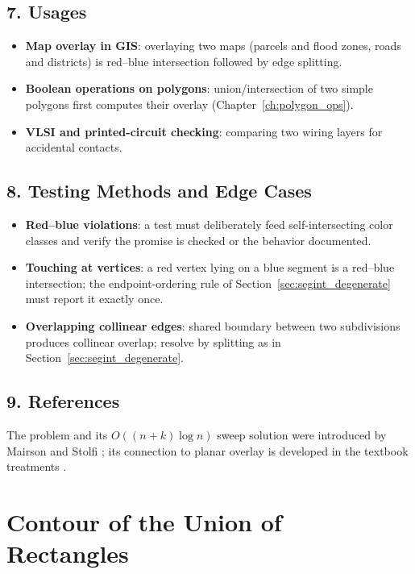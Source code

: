 \subsection{7. Usages}

\begin{itemize}
\item \textbf{Map overlay in GIS}: overlaying two maps (parcels and
  flood zones, roads and districts) is red--blue intersection followed by
  edge splitting.
\item \textbf{Boolean operations on polygons}: union/intersection of two
  simple polygons first computes their overlay (Chapter~\ref{ch:polygon_ops}).
\item \textbf{VLSI and printed-circuit checking}: comparing two wiring
  layers for accidental contacts.
\end{itemize}

\subsection{8. Testing Methods and Edge Cases}

\begin{itemize}
\item \textbf{Red--blue violations}: a test must deliberately feed
  self-intersecting color classes and verify the promise is checked or the
  behavior documented.
\item \textbf{Touching at vertices}: a red vertex lying on a blue segment
  is a red--blue intersection; the endpoint-ordering rule of
  Section~\ref{sec:segint_degenerate} must report it exactly once.
\item \textbf{Overlapping collinear edges}: shared boundary between two
  subdivisions produces collinear overlap; resolve by splitting as in
  Section~\ref{sec:segint_degenerate}.
\end{itemize}

\subsection{9. References}

The problem and its $O((n+k)\log n)$ sweep solution were introduced by
Mairson and Stolfi \cite{mairson1988}; its connection to planar overlay is
developed in the textbook treatments \cite{berg2008,preparata1985}.

\section{Contour of the Union of Rectangles}
\label{sec:segint_union_rectangles}

